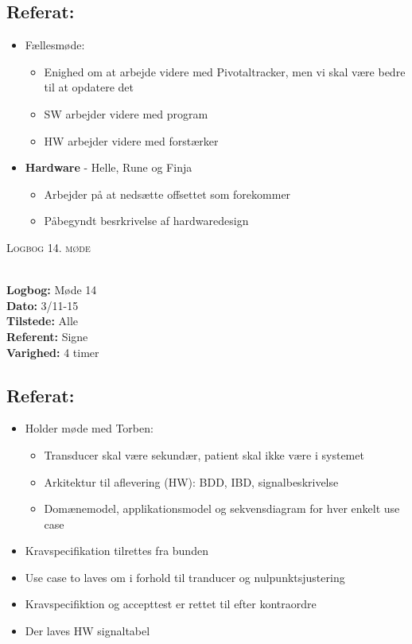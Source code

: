 \documentclass[a4paper,11pt,oneside]{memoir}
\begin{document}
\subsection{Referat:}
\begin{itemize}
\item Fællesmøde:
\begin{itemize}
\item Enighed om at arbejde videre med Pivotaltracker, men vi skal være bedre til at opdatere det
\item SW arbejder videre med program
\item HW arbejder videre med forstærker
\end{itemize}
\item \textbf{Hardware} - Helle, Rune og Finja
\begin{itemize}
\item Arbejder på at nedsætte offsettet som forekommer
\item Påbegyndt besrkrivelse af hardwaredesign
\end{itemize} 
\end{itemize}

\newpage


\begin{center} 
\huge{\textsc{Logbog 14. møde}}
\end{center}

\textbf{ }
\\
\textbf{Logbog:} Møde 14
\\
\textbf{Dato:} 3/11-15
\\
\textbf{Tilstede:} Alle
\\
\textbf{Referent:} Signe
\\
\textbf{Varighed:} 4 timer
\\

\subsection{Referat:}
\begin{itemize}
\item Holder møde med Torben:
\begin{itemize}
\item Transducer skal være sekundær, patient skal ikke være i systemet
\item Arkitektur til aflevering (HW): BDD, IBD, signalbeskrivelse 
\item Domænemodel, applikationsmodel og sekvensdiagram for hver enkelt use case
\end{itemize}
\item Kravspecifikation tilrettes fra bunden 
\item Use case to laves om i forhold til tranducer og nulpunktsjustering
\item Kravspecifiktion og accepttest er rettet til efter kontraordre
\item Der laves HW signaltabel
\end{itemize}
\end{document}
